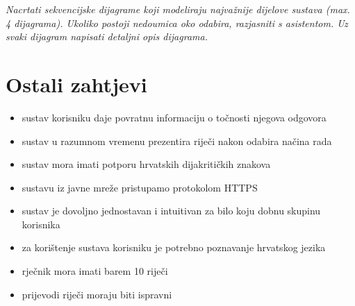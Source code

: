 				\textit{Nacrtati sekvencijske dijagrame koji modeliraju najvažnije dijelove sustava (max. 4 dijagrama). Ukoliko postoji nedoumica oko odabira, razjasniti s asistentom. Uz svaki dijagram napisati detaljni opis dijagrama.}
				\eject
	
				\section{Ostali zahtjevi}

				\begin{itemize}
					\item sustav korisniku daje povratnu informaciju o točnosti njegova odgovora
					\item sustav u razumnom vremenu prezentira riječi nakon odabira načina rada
					\item sustav mora imati potporu hrvatskih dijakritičkih znakova
					\item sustavu iz javne mreže pristupamo protokolom HTTPS
					\item sustav je dovoljno jednostavan i intuitivan za bilo koju dobnu skupinu korisnika 
					\item za korištenje sustava korisniku je potrebno poznavanje hrvatskog jezika
					\item rječnik mora imati barem 10 riječi
					\item prijevodi riječi moraju biti ispravni
				\end{itemize}
			 
			 
			 
	